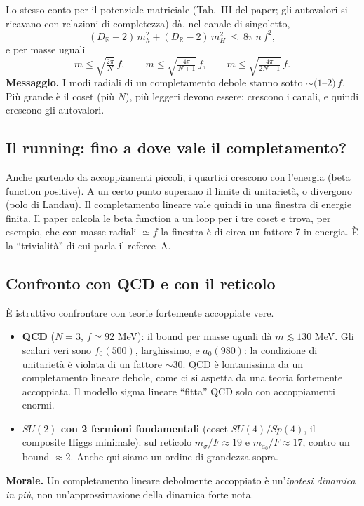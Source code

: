 \documentclass[11pt,a4paper]{article}
\numberwithin{equation}{section}
\theoremstyle{remark}
\newcommand{\R}{\mathbb{R}}
\begin{document}
Lo stesso conto per il potenziale matriciale (Tab.~III del paper; gli autovalori si ricavano con relazioni di completezza) dà, nel canale di singoletto,
\[
(D_\R+2)\,m_h^2+(D_\R-2)\,m_H^2\ \le\ 8\pi\,n\,f^2 ,
\]
e per masse uguali
\[
m\le\sqrt{\tfrac{2\pi}{N}}\,f,\qquad m\le\sqrt{\tfrac{4\pi}{N+1}}\,f,\qquad m\le\sqrt{\tfrac{4\pi}{2N-1}}\,f .
\]
\textbf{Messaggio.} I modi radiali di un completamento debole stanno sotto $\sim(1$--$2)\,f$. Più grande è il coset (più $N$), più leggeri devono essere: crescono i canali, e quindi crescono gli autovalori.

\subsection{Il running: fino a dove vale il completamento?}

Anche partendo da accoppiamenti piccoli, i quartici crescono con l'energia (beta function positive). A un certo punto superano il limite di unitarietà, o divergono (polo di Landau). Il completamento lineare vale quindi in una finestra di energie finita. Il paper calcola le beta function a un loop per i tre coset e trova, per esempio, che con masse radiali $\simeq f$ la finestra è di circa un fattore 7 in energia. È la ``trivialità'' di cui parla il referee~A.

\subsection{Confronto con QCD e con il reticolo}

È istruttivo confrontare con teorie fortemente accoppiate vere.
\begin{itemize}
\item \textbf{QCD} ($N=3$, $f\simeq92$ MeV): il bound per masse uguali dà $m\lesssim130$ MeV. Gli scalari veri sono $f_0(500)$, larghissimo, e $a_0(980)$: la condizione di unitarietà è violata di un fattore $\sim30$. QCD è lontanissima da un completamento lineare debole, come ci si aspetta da una teoria fortemente accoppiata. Il modello sigma lineare ``fitta'' QCD solo con accoppiamenti enormi.
\item \textbf{$SU(2)$ con 2 fermioni fondamentali} (coset $SU(4)/Sp(4)$, il composite Higgs minimale): sul reticolo $m_\sigma/F\approx19$ e $m_{a_0}/F\approx17$, contro un bound $\approx2$. Anche qui siamo un ordine di grandezza sopra.
\end{itemize}
\textbf{Morale.} Un completamento lineare debolmente accoppiato è un'\emph{ipotesi dinamica in più}, non un'approssimazione della dinamica forte nota.
\end{document}
